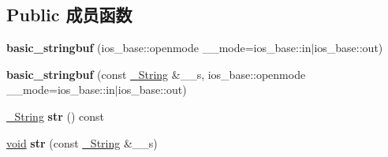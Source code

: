 \subsection*{Public 成员函数}
\begin{DoxyCompactItemize}
\item 
\mbox{\label{classbasic__stringbuf_a58d73a3973dbea10b71f79074ea31f2c}} 
{\bfseries basic\+\_\+stringbuf} (ios\+\_\+base\+::openmode \+\_\+\+\_\+mode=ios\+\_\+base\+::in$\vert$ios\+\_\+base\+::out)
\item 
\mbox{\label{classbasic__stringbuf_a0c87978a1d95224e6bde95fe5e5b71b4}} 
{\bfseries basic\+\_\+stringbuf} (const \hyperlink{classbasic__string}{\+\_\+\+String} \&\+\_\+\+\_\+s, ios\+\_\+base\+::openmode \+\_\+\+\_\+mode=ios\+\_\+base\+::in$\vert$ios\+\_\+base\+::out)
\item 
\mbox{\label{classbasic__stringbuf_a8148f1b7b60e667e2c304a59f000a7dc}} 
\hyperlink{classbasic__string}{\+\_\+\+String} {\bfseries str} () const
\item 
\mbox{\label{classbasic__stringbuf_aecf0304a0d1472702739a658d380446a}} 
\hyperlink{interfacevoid}{void} {\bfseries str} (const \hyperlink{classbasic__string}{\+\_\+\+String} \&\+\_\+\+\_\+s)
\end{DoxyCompactItemize}
